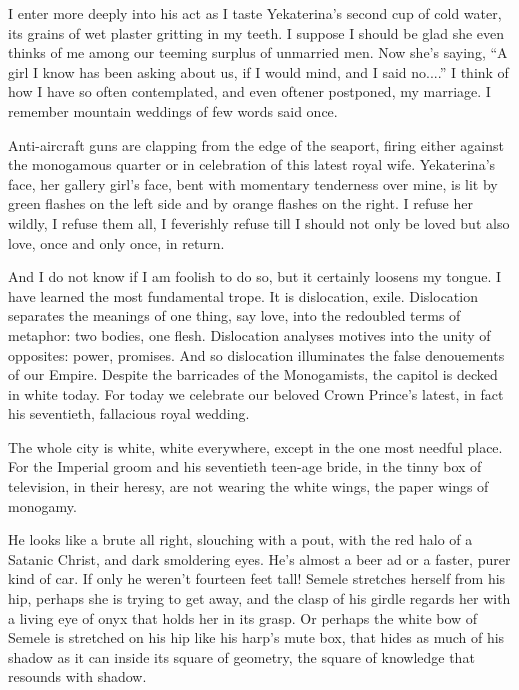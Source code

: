 \documentclass[english,11pt,letterpaper,onecolumn]{scrbook}
\begin{document}
	I enter more deeply into his act as I taste Yekaterina's second cup of cold water, its grains of wet plaster gritting in my teeth.  I suppose I should be glad she even thinks of me among our teeming surplus of unmarried men.  Now she's saying, ``A girl I know has been asking about us, if I would mind, and I said no....''  I think of how I have so often contemplated, and even oftener postponed, my marriage.  I remember mountain weddings of few words said once.

	Anti-aircraft guns are clapping from the edge of the seaport, firing either against the monogamous quarter or in celebration of this latest royal wife.  Yekaterina's face, her gallery girl's face, bent with momentary tenderness over mine, is lit by green flashes on the left side and by orange flashes on the right.  I refuse her wildly, I refuse them all, I feverishly refuse till I should not only be loved but also love, once and only once, in return.

	And I do not know if I am foolish to do so, but it certainly loosens my tongue.  I have learned the most fundamental trope.  It is dislocation, exile.  Dislocation separates the meanings of one thing, say love, into the redoubled terms of metaphor:  two bodies, one flesh.  Dislocation analyses motives into the unity of opposites:  power, promises.  And so dislocation illuminates the false denouements of our Empire.  Despite the barricades of the Monogamists, the capitol is decked in white today.  For today we celebrate our beloved Crown Prince's latest, in fact his seventieth, fallacious royal wedding.

	The whole city is white, white everywhere, except in the one most needful place.  For the Imperial groom and his seventieth teen-age bride, in the tinny box of television, in their heresy, are not wearing the white wings, the paper wings of monogamy.


\newpage
{}

He looks like a brute all right, slouching with a pout, with the red halo of a Satanic Christ, and dark smoldering eyes.  He's almost a beer ad or a faster, purer kind of car.  If only he weren't fourteen feet tall!
Semele stretches herself from his hip, perhaps she is trying to get away, and the clasp of his girdle regards her with a living eye of onyx that holds her in its grasp.  Or perhaps the white bow of Semele is stretched on his hip like his harp's mute box, that hides as much of his shadow as it can inside its square of geometry, the square of knowledge that resounds with shadow.
\end{document}
